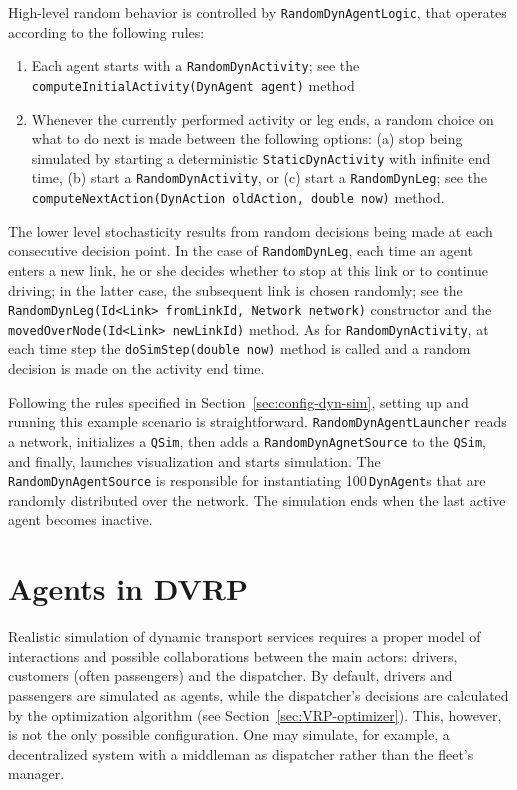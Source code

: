 High-level random behavior is controlled by \lstinline$RandomDynAgentLogic$, that operates according to the following rules:
%
\begin{enumerate}\styleEnumerate

	\item Each agent starts with a \lstinline$RandomDynActivity$; see the \lstinline$computeInitialActivity(DynAgent agent)$ method
	
	\item Whenever the currently performed activity or leg ends, a random choice on what to do next is made between the following options: (a) stop being simulated by starting a deterministic \lstinline$StaticDynActivity$ with infinite end time, (b) start a \lstinline$RandomDynActivity$, or (c) start a \lstinline$RandomDynLeg$; see the \lstinline$computeNextAction(DynAction oldAction, double now)$ method.

\end{enumerate}

The lower level stochasticity results from random decisions being made at each consecutive decision point. In the case of \lstinline$RandomDynLeg$, each time an agent enters a new link, he or she decides whether to stop at this link or to continue driving; in the latter case, the subsequent link is chosen randomly; see the \lstinline$RandomDynLeg(Id<Link> fromLinkId, Network network)$ constructor and the \lstinline$movedOverNode(Id<Link> newLinkId)$ method. As for \lstinline$RandomDynActivity$, at each time step the \lstinline$doSimStep(double now)$ method is called and a random decision is made on the activity end time.

Following the rules specified in Section~\ref{sec:config-dyn-sim}, setting up and running this example scenario is straightforward. \lstinline$RandomDynAgentLauncher$ reads a network, initializes a \lstinline$QSim$, then adds a \lstinline$RandomDynAgnetSource$ to the \lstinline$QSim$, and finally, launches visualization and starts simulation. The \lstinline$RandomDynAgentSource$ is responsible for instantiating 100\,\lstinline$DynAgent$s that are randomly distributed over the network. The simulation ends when the last active agent becomes inactive.

\section{Agents in DVRP}
Realistic simulation of dynamic transport services requires a proper model of interactions and possible collaborations between the main actors: drivers, customers (often passengers) and the dispatcher. By default, drivers and passengers are simulated as agents, while the dispatcher's decisions are calculated by the optimization algorithm (see Section~\ref{sec:VRP-optimizer}). This, however, is not the only possible configuration. One may simulate, for example, a decentralized system with  a middleman as dispatcher rather than the fleet's manager.

